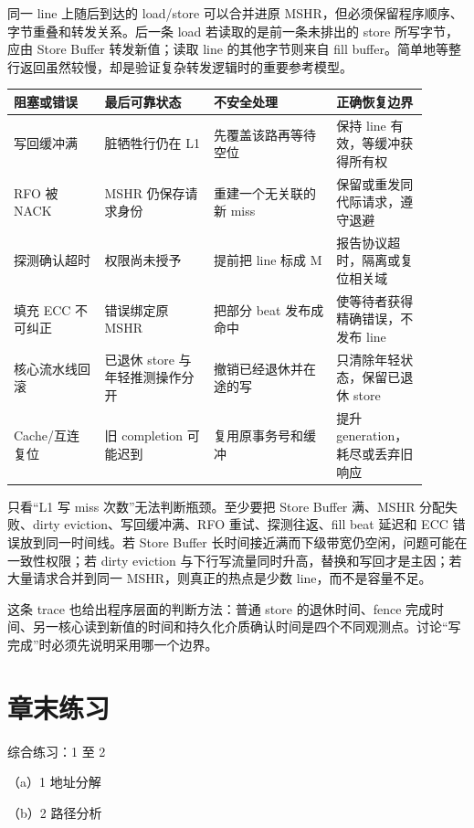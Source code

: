 同一 line 上随后到达的 load/store 可以合并进原 MSHR，但必须保留程序顺序、字节重叠和转发关系。后一条 load 若读取的是前一条未排出的 store 所写字节，应由 Store Buffer 转发新值；读取 line 的其他字节则来自 fill buffer。简单地等整行返回虽然较慢，却是验证复杂转发逻辑时的重要参考模型。

\begin{longtable}{L{0.2\linewidth}L{0.24\linewidth}L{0.27\linewidth}L{0.19\linewidth}}
\toprule
阻塞或错误 & 最后可靠状态 & 不安全处理 & 正确恢复边界 \\
\midrule
写回缓冲满 & 脏牺牲行仍在 L1 & 先覆盖该路再等待空位 & 保持 line 有效，等缓冲获得所有权 \\\tablerowrule
RFO 被 NACK & MSHR 仍保存请求身份 & 重建一个无关联的新 miss & 保留或重发同代际请求，遵守退避 \\\tablerowrule
探测确认超时 & 权限尚未授予 & 提前把 line 标成 M & 报告协议超时，隔离或复位相关域 \\\tablerowrule
填充 ECC 不可纠正 & 错误绑定原 MSHR & 把部分 beat 发布成命中 & 使等待者获得精确错误，不发布 line \\\tablerowrule
核心流水线回滚 & 已退休 store 与年轻推测操作分开 & 撤销已经退休并在途的写 & 只清除年轻状态，保留已退休 store \\\tablerowrule
Cache/互连复位 & 旧 completion 可能迟到 & 复用原事务号和缓冲 & 提升 generation，耗尽或丢弃旧响应 \\
\bottomrule
\end{longtable}


只看“L1 写 miss 次数”无法判断瓶颈。至少要把 Store Buffer 满、MSHR 分配失败、dirty eviction、写回缓冲满、RFO 重试、探测往返、fill beat 延迟和 ECC 错误放到同一时间线。若 Store Buffer 长时间接近满而下级带宽仍空闲，问题可能在一致性权限；若 dirty eviction 与下行写流量同时升高，替换和写回才是主因；若大量请求合并到同一 MSHR，则真正的热点是少数 line，而不是容量不足。

这条 trace 也给出程序层面的判断方法：普通 store 的退休时间、fence 完成时间、另一核心读到新值的时间和持久化介质确认时间是四个不同观测点。讨论“写完成”时必须先说明采用哪一个边界。

\section*{章末练习}

\begin{chapterexercise}{综合练习：1 至 2}
\begin{exercisesubproblem}{（a）1}
地址分解
\end{exercisesubproblem}
\begin{exercisesubproblem}{（b）2}
路径分析
\end{exercisesubproblem}
\end{chapterexercise}

